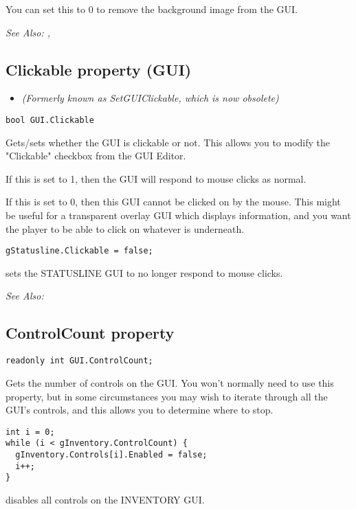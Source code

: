 You can set this to 0 to remove the background image from the GUI.

\it{See Also:} ,



\subsection{Clickable property (GUI)}\label{GUI.Clickable}%

\begin{itemize}
\item \it{(Formerly known as SetGUIClickable, which is now obsolete)}
\end{itemize}

\begin{verbatim}
bool GUI.Clickable
\end{verbatim}
Gets/sets whether the GUI is clickable or not. This allows you to modify the "Clickable"
checkbox from the GUI Editor.

If this is set to 1, then the GUI will respond to mouse clicks as normal.

If this is set to 0, then this GUI cannot be clicked on by the mouse. This might be
useful for a transparent overlay GUI which displays information, and you want the
player to be able to click on whatever is underneath.

\begin{verbatim}
gStatusline.Clickable = false;
\end{verbatim}
sets the STATUSLINE GUI to no longer respond to mouse clicks.

\it{See Also:} 


\subsection{ControlCount property}\label{GUI.ControlCount}%

\begin{verbatim}
readonly int GUI.ControlCount;
\end{verbatim}
Gets the number of controls on the GUI. You won't normally need to use this property,
but in some circumstances you may wish to iterate through all the GUI's controls,
and this allows you to determine where to stop.

\begin{verbatim}
int i = 0;
while (i < gInventory.ControlCount) {
  gInventory.Controls[i].Enabled = false;
  i++;
}
\end{verbatim}
disables all controls on the INVENTORY GUI.

